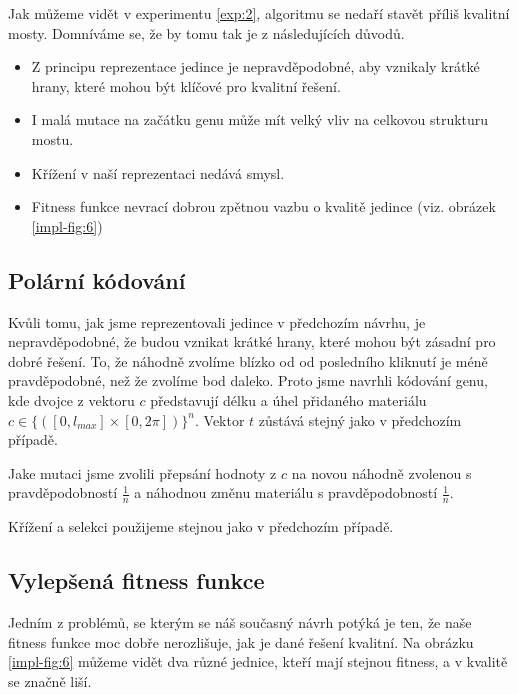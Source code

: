 Jak můžeme vidět v experimentu \ref{exp:2}, algoritmu se nedaří stavět příliš kvalitní mosty. Domníváme se, že by tomu tak je z následujících důvodů.

\begin{itemize}
    \item Z principu reprezentace jedince je nepravděpodobné, aby vznikaly krátké hrany, které mohou být klíčové pro kvalitní řešení.
    \item I malá mutace na začátku genu může mít velký vliv na celkovou strukturu mostu.
    \item Křížení v naší reprezentaci nedává smysl.
    \item Fitness funkce nevrací dobrou zpětnou vazbu o kvalitě jedince (viz. obrázek \ref{impl-fig:6})
\end{itemize}

\subsection{Polární kódování}

Kvůli tomu, jak jsme reprezentovali jedince v předchozím návrhu, je nepravděpodobné, že budou vznikat krátké hrany, které mohou být zásadní pro dobré řešení. To, že náhodně zvolíme blízko od od posledního kliknutí je méně pravděpodobné, než že zvolíme bod daleko. Proto jsme navrhli kódování genu, kde dvojce z vektoru $c$ představují délku a úhel přidaného materiálu $c \in \{([0, l_{max}] \times [0, 2 \pi])\}^n$. Vektor $t$ zůstává stejný jako v předchozím případě.

Jake mutaci jsme zvolili přepsání hodnoty z $c$ na novou náhodně zvolenou s pravděpodobností $\frac{1}{n}$ a náhodnou změnu materiálu s pravděpodobností $\frac{1}{n}$.

Křížení a selekci použijeme stejnou jako v předchozím případě.

\subsection{Vylepšená fitness funkce}

Jedním z problémů, se kterým se náš současný návrh potýká je ten, že naše fitness funkce moc dobře nerozlišuje, jak je dané řešení kvalitní. Na obrázku \ref{impl-fig:6} můžeme vidět dva různé jednice, kteří mají stejnou fitness, a v kvalitě se značně liší.


